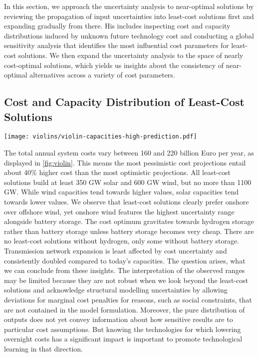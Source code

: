 In this section, we approach the uncertainty analysis to near-optimal solutions
by reviewing the propagation of input uncertainties into 
least-cost solutions first and expanding gradually from there.
His includes inspecting cost and capacity distributions
induced by unknown future technology cost
and conducting a global sensitivity analysis that identifies the most
influential cost parameters for least-cost solutions.
We then expand the uncertainty analysis to the space of nearly cost-optimal solutions,
which yields us insights about the consistency of near-optimal alternatives across a variety of cost parameters.

\subsection{Cost and Capacity Distribution of Least-Cost Solutions}

\begin{SCfigure}
    \texttt{[image: violins/violin-capacities-high-prediction.pdf]}
    \caption{
      Distribution of total system cost, generation, storage, and transmission capacities
      for least-cost solutions.
    }
    \label{fig:violin}
\end{SCfigure}

The total annual system costs vary between 160 and 220 billion Euro per year,
as displayed in \cref{fig:violin}.
This means the most pessimistic cost projections
entail about 40\% higher cost than the most optimistic projections.
All least-cost solutions build at least 350 GW solar and 600 GW wind, but no more than 1100 GW.
While wind capacities tend towards higher values, solar capacities tend towards lower values.
We observe that least-cost solutions clearly prefer onshore over offshore wind, yet
onshore wind features the highest uncertainty range alongside battery storage.
The cost optimum gravitates towards hydrogen storage rather than battery storage
unless battery storage becomes very cheap.
There are no least-cost solutions without hydrogen, only some without battery storage.
Transmission network expansion is least affected by cost uncertainty and consistently
doubled compared to today's capacities.
The question arises, what we can conclude from these insights.
The interpretation of the observed ranges may be limited because
they are not robust when we look beyond the least-cost solutions and acknowledge
structural modelling uncertainties by allowing deviations for marginal cost penalties
for reasons, such as social constraints, that are not contained in the model formulation.
Moreover, the pure distribution of outputs does not yet convey information about
how sensitive results are to particular cost assumptions.
But knowing the technologies for which lowering overnight costs has a significant impact
is important to promote technological learning in that direction.

